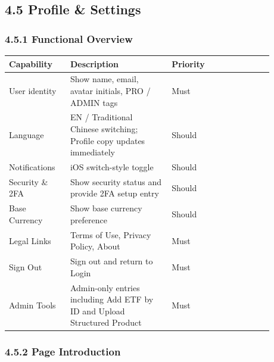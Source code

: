 \subsection{4.5 Profile \& Settings}

\subsubsection{4.5.1 Functional Overview}

\begingroup
\small
\begin{longtable}{L{0.20\linewidth}L{0.34\linewidth}L{0.34\linewidth}}
\toprule
\textbf{Capability} & \textbf{Description} & \textbf{Priority} \\
\midrule
User identity & Show name, email, avatar initials, PRO / ADMIN tags & Must \\
Language & EN / Traditional Chinese switching; Profile copy updates immediately & Should \\
Notifications & iOS switch-style toggle & Should \\
Security \& 2FA & Show security status and provide 2FA setup entry & Should \\
Base Currency & Show base currency preference & Should \\
Legal Links & Terms of Use, Privacy Policy, About & Must \\
Sign Out & Sign out and return to Login & Must \\
Admin Tools & Admin-only entries including Add ETF by ID and Upload Structured Product & Must \\
\bottomrule
\end{longtable}
\endgroup

\subsubsection{4.5.2 Page Introduction}


